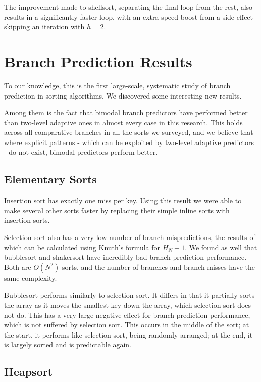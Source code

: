 The improvement made to shellsort, separating the final loop from the rest, also
results in a significantly faster loop, with an extra speed boost from a
side-effect skipping an iteration with $h = 2$.


\section{Branch Prediction Results}

To our knowledge, this is the first large-scale, systematic study of branch
prediction in sorting algorithms. We discovered some interesting new results. 

Among them is the fact that bimodal branch predictors have performed better than
two-level adaptive ones in almost every case in this research. This holds across
all comparative branches in all the sorts we surveyed, and we believe that where
explicit patterns - which can be exploited by two-level adaptive predictors - do
not exist, bimodal predictors perform better.


\subsection{Elementary Sorts}

Insertion sort has exactly one miss per key. Using this result we were able to
make several other sorts faster by replacing their simple inline sorts with
insertion sorts.

Selection sort also has a very low number of branch mispredictions, the results
of which can be calculated using Knuth's formula for $H_N-1$. We found as well
that bubblesort and shakersort have incredibly bad branch prediction
performance. Both are $O(N^2)$ sorts, and the number of branches and branch
misses have the same complexity.

Bubblesort performs similarly to selection sort. It differs in that it partially
sorts the array as it moves the smallest key down the array, which selection sort
does not do. This has a very large negative effect for branch prediction
performance, which is not suffered by selection sort. This occurs in the middle
of the sort; at the start, it performs like selection sort, being randomly
arranged; at the end, it is largely sorted and is predictable again.

\subsection{Heapsort}


